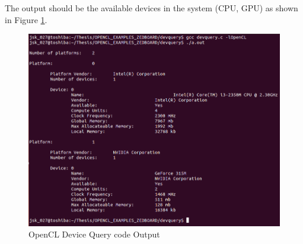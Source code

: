 The output should be the available devices in the system (CPU, GPU) as shown in Figure \ref{fig:DeviceQuery}.
\begin{figure}[h!]
\centering
\includegraphics[width=0.7\linewidth]{figures/DeviceQuery.png}
\caption{OpenCL Device Query code Output
\cite{devquery}}
\label{fig:DeviceQuery}
\end{figure}
